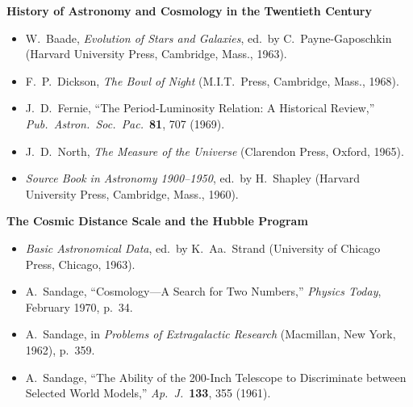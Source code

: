 \medskip
\noindent\textbf{History of Astronomy and Cosmology in the Twentieth
Century}\par
\begin{itemize}
  \item[\(\square\)] W.~Baade, \emph{Evolution of Stars and Galaxies},
  ed.\ by C.~Payne-Gaposchkin
  (Harvard University Press, Cambridge, Mass., 1963).

  \item[\(\square\)] F.~P.~Dickson, \emph{The Bowl of Night}
  (M.I.T.\ Press, Cambridge, Mass., 1968).

  \item[\(\square\)] J.~D.~Fernie,
  ``The Period-Luminosity Relation: A Historical Review,''
  \emph{Pub.\ Astron.\ Soc.\ Pac.}\ \textbf{81}, 707 (1969).

  \item[\(\square\)] J.~D.~North, \emph{The Measure of the Universe}
  (Clarendon Press, Oxford, 1965).

  \item[\(\square\)] \emph{Source Book in Astronomy 1900--1950},
  ed.\ by H.~Shapley (Harvard University Press, Cambridge, Mass., 1960).
\end{itemize}

\medskip
\noindent\textbf{The Cosmic Distance Scale and the Hubble Program}\par
\begin{itemize}
  \item[\(\square\)] \emph{Basic Astronomical Data},
  ed.\ by K.~Aa.~Strand (University of Chicago Press, Chicago, 1963).

  \item[\(\square\)] A.~Sandage,
  ``Cosmology---A Search for Two Numbers,''
  \emph{Physics Today}, February 1970, p.~34.

  \item[\(\square\)] A.~Sandage, in
  \emph{Problems of Extragalactic Research}
  (Macmillan, New York, 1962), p.~359.

  \item[\(\square\)] A.~Sandage,
  ``The Ability of the 200-Inch Telescope to Discriminate between Selected
  World Models,'' \emph{Ap.\ J.}\ \textbf{133}, 355 (1961).
\end{itemize}

